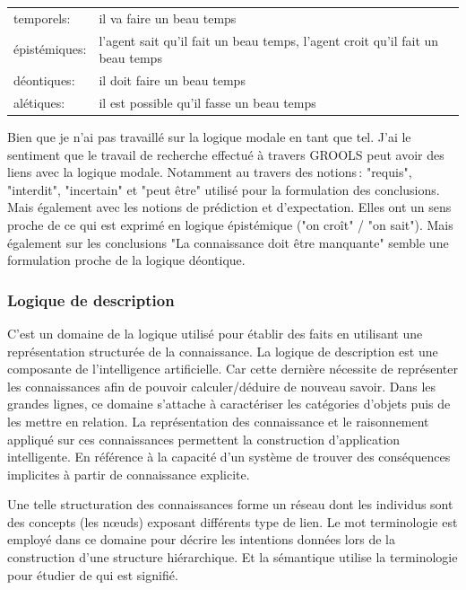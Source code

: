 \begin{refsegment}
    \begin{tabular}{ll}
        temporels:      & il va faire un beau temps \\
        épistémiques:   & l'agent sait qu'il fait un beau temps,  l'agent croit qu'il fait un beau temps \\
        déontiques:     & il doit faire un beau temps \\
        alétiques:      & il est possible qu'il fasse un beau temps \\
    \end{tabular}

    Bien que je n'ai pas travaillé sur la logique modale en tant que tel. J'ai le sentiment que le travail de recherche effectué à travers \gls{GROOLS} peut avoir des liens avec la logique modale. Notamment au travers des notions : "requis", "interdit", "incertain" et "peut être" utilisé pour la formulation des conclusions. Mais également avec les notions de prédiction et d'expectation. Elles ont un sens proche de ce qui est exprimé en logique épistémique ("on croît" / "on sait"). Mais également sur les conclusions "La connaissance doit être manquante" semble une formulation proche de la logique déontique.
    
    
    
    \subsubsection{Logique de description}
    
    C'est un domaine de la logique utilisé pour établir des faits en utilisant une représentation structurée de la connaissance. La logique de description est une composante de l'intelligence artificielle. Car cette dernière nécessite de représenter les connaissances afin de pouvoir calculer/déduire de nouveau savoir. Dans les grandes lignes, ce domaine s'attache à caractériser les catégories d'objets puis de les mettre en relation. La représentation des connaissance et le raisonnement appliqué sur ces connaissances permettent la construction d'application intelligente. En référence à la capacité d'un système de trouver des conséquences implicites à partir de connaissance explicite.
    
    Une telle structuration des connaissances forme un réseau dont les individus sont des concepts (les nœuds) exposant différents type de lien. Le mot terminologie est employé dans ce domaine pour décrire les intentions données lors de la construction d'une structure hiérarchique. Et la sémantique utilise la terminologie pour étudier de qui est signifié.
    

\end{refsegment}
